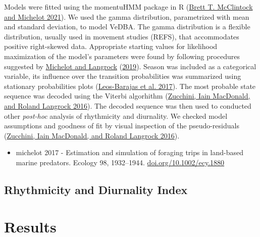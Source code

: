 \documentclass[english,msc,numbers,hidelinks]{coppe}
\providecommand{\tightlist}{%
  \setlength{\itemsep}{0pt}\setlength{\parskip}{0pt}}
\begin{document}
  Models were fitted using the momentuHMM package in R (\protect\hyperlink{ref-mcclintock2021}{Brett T. McClintock and Michelot 2021}). We used the gamma distribution, parametrized with mean and standard deviation, to model VeDBA. The gamma distribution is a flexible distribution, usually used in movement studies (REFS), that accommodates positive right-skewed data. Appropriate starting values for likelihood maximization of the model's parameters were found by following procedures suggested by \protect\hyperlink{ref-michelot2019}{Michelot and Langrock} (\protect\hyperlink{ref-michelot2019}{2019}). Season was included as a categorical variable, its influence over the transition probabilities was summarized using stationary probabilities plots (\protect\hyperlink{ref-leosbarajas2017}{Leos-Barajas et al. 2017}). The most probable state sequence was decoded using the Viterbi algorhithm (\protect\hyperlink{ref-zucchini2016}{Zucchini, Iain MacDonald, and Roland Langrock 2016}). The decoded sequence was then used to conducted other \emph{post-hoc} analysis of rhythmicity and diurnality. We checked model assumptions and goodness of fit by visual inspection of the pseudo-residuals (\protect\hyperlink{ref-zucchini2016}{Zucchini, Iain MacDonald, and Roland Langrock 2016}).
  \begin{itemize}
  \tightlist
  \item
    michelot 2017 - Estimation and simulation of foraging trips in land-based marine predators. Ecology 98, 1932--1944. \href{https://doi.org/10.1002/ecy.1880}{doi.org/10.1002/ecy.1880}
  \end{itemize}
  \hypertarget{rhythmicity-and-diurnality-index}{%
  \subsection{Rhythmicity and Diurnality Index}\label{rhythmicity-and-diurnality-index}}

  \hypertarget{results}{%
  \section{Results}\label{results}}
\end{document}
